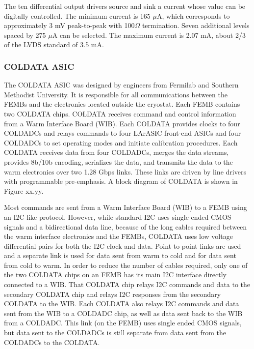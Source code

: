 The ten differential output drivers source and sink a current whose value can be digitally controlled.  The minimum current is 165 $\mu$A, which corresponds to approximately 3 mV peak-to-peak with 100$\Omega$ termination.  Seven additional levels spaced by 275 $\mu$A can be selected.  The maximum current is 2.07 mA, about 2/3 of the LVDS standard of 3.5 mA.


\subsubsection{COLDATA ASIC}
\label{sec:fdsp-tpcelec-design-femb-coldata}

The COLDATA ASIC was designed by engineers from Fermilab and Southern Methodist University.  It is responsible for all communications between the FEMBs and the electronics located outside the cryostat.  Each FEMB contains two COLDATA chips.  COLDATA receives command and control information from a Warm Interface Board (WIB).  Each COLDATA provides clocks to four COLDADCs and relays commands to four LArASIC front-end ASICs and four COLDADCs to set operating modes and initiate calibration procedures.  Each COLDATA receives data from four COLDADCs, merges the data streams, provides 8b/10b encoding, serializes the data, and transmits the data to the warm electronics over two 1.28 Gbps links.  These links are driven by line drivers with programmable pre-emphasis.  A block diagram of COLDATA is shown in Figure xx.yy.

Most commands are sent from a Warm Interface Board (WIB) to a FEMB using an I2C-like\cite{I2C} protocol.  However, while standard I2C uses single ended CMOS signals and a bidirectional data line, because of the long cables required between the warm interface electronics and the FEMBs, COLDATA uses low voltage differential pairs for both the I2C clock and data.  Point-to-point links are used and a separate link is used for data sent from warm to cold and for data sent from cold to warm.  In order to reduce the number of cables required, only one of the two COLDATA chips on an FEMB has its main I2C interface directly connected to a WIB.  That COLDATA chip relays I2C commands and data to the secondary COLDATA chip and relays I2C responses from the secondary COLDATA to the WIB.  Each COLDATA also relays I2C commands and data sent from the WIB to a COLDADC chip, as well as data sent back to the WIB from a COLDADC.  This link (on the FEMB) uses single ended CMOS signals, but data sent to the COLDADCs is still separate from data sent from the COLDADCs to the COLDATA.

